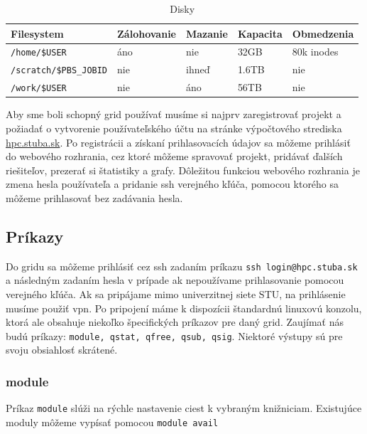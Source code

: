 \begin{table}[!h]
\centering
\begin{tabular}{@{}lllll@{}}
\toprule
\textbf{Filesystem}   & \textbf{Zálohovanie} & \textbf{Mazanie} & \textbf{Kapacita} & \textbf{Obmedzenia} \\ \midrule
\texttt{/home/\$USER}          & áno                  & nie              & 32GB              & 80k inodes          \\
\texttt{/scratch/\$PBS\_JOBID} & nie                  & ihneď            & 1.6TB             & nie                 \\
\texttt{/work/\$USER}          & nie                  & áno              & 56TB              & nie                 \\ \bottomrule
\end{tabular}
\caption{Disky}
\label{tab:filesystem}
\end{table}

Aby sme boli schopný grid používať musíme si najprv zaregistrovať projekt a požiadať o vytvorenie
používateľského účtu na stránke výpočtového strediska \url{hpc.stuba.sk}.
Po registrácii a získaní prihlasovacích údajov sa môžeme prihlásiť do webového rozhrania, cez ktoré môžeme spravovať projekt,
pridávať ďalších riešiteľov, prezerať si štatistiky a grafy.
Dôležitou funkciou webového rozhrania je zmena hesla používateľa a pridanie \acrshort{ssh} verejného kľúča, pomocou ktorého sa môžeme prihlasovať bez zadávania hesla.

\subsection{Príkazy}
Do gridu sa môžeme prihlásiť cez \acrshort{ssh} zadaním príkazu \texttt{ssh login@hpc.stuba.sk} a následným zadaním hesla v prípade ak nepoužívame prihlasovanie pomocou verejného kľúča.
Ak sa pripájame mimo univerzitnej siete STU, na prihlásenie musíme použiť \acrshort{vpn}.
Po pripojení máme k dispozícii štandardnú linuxovú konzolu, ktorá ale obsahuje niekoľko špecifických príkazov pre daný grid.
Zaujímať nás budú príkazy: \texttt{module, qstat, qfree, qsub, qsig}.
Niektoré výstupy sú pre svoju obsiahlosť skrátené.

\subsubsection{module}
\label{kap:module}
Príkaz \texttt{module} slúži na rýchle nastavenie ciest k vybraným knižniciam. Existujúce moduly môžeme vypísať pomocou \texttt{module avail}

